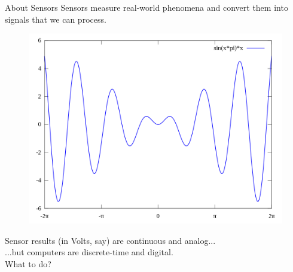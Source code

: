 \documentclass[aspectratio=169]{beamer}
\begin{document}
	\begin{frame}[t]{About Sensors}
		\small Sensors measure real-world phenomena and convert them into signals that we can process.	\\
		\vspace{0.5em}
		\begin{figure}
			\centering
			\includegraphics[width=\textwidth,height=0.6\textheight,keepaspectratio]{img/sine.png}
		\end{figure}
		Sensor results (in Volts, say) are continuous and analog...	\\	
		\hspace{2em}...but computers are discrete-time and digital. \\	
		\vspace{2em}		
		What to do? \\
	\end{frame}
\end{document}
